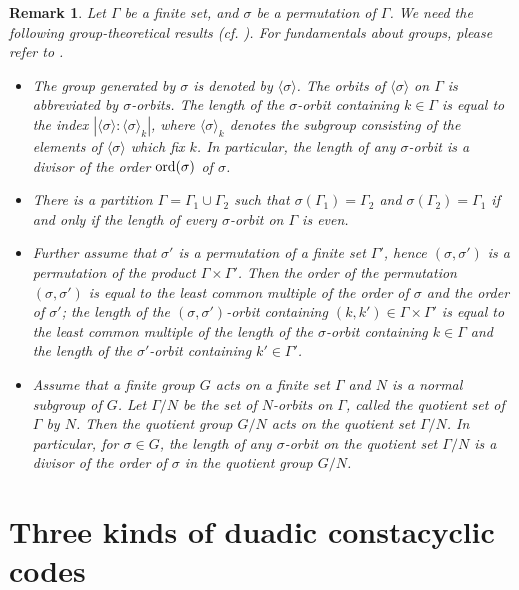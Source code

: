 \documentclass{article}
\newtheorem{Remark}[Theorem]{Remark}
\numberwithin{equation}{section}
\numberwithin{table}{section}
\begin{document}
\begin{Remark}\label{group theory}\rm
Let $\Gamma$ be a finite set, and $\sigma$ be a permutation of $\Gamma$.
We need the following group-theoretical results (cf. \cite[Lemmas 6-8]{CDFL}).
For fundamentals about groups, please refer to \cite{AB}.
\begin{itemize}
\item[(i)]
The group generated by $\sigma$ is denoted by $\langle\sigma\rangle$.
The orbits of $\langle\sigma\rangle$ on $\Gamma$ is abbreviated by
{\em $\sigma$-orbits}. The length of the $\sigma$-orbit containing
$k\in\Gamma$ is equal to the index
$|\langle\sigma\rangle:\langle\sigma\rangle_k|$, where
$\langle\sigma\rangle_k$ denotes the subgroup consisting of
the elements of $\langle\sigma\rangle$ which fix $k$.
In particular, the length of any $\sigma$-orbit is a divisor of the
order ${\rm ord}(\sigma)$ of $\sigma$.
\item[(ii)]
There is a  partition $\Gamma=\Gamma_1\cup\Gamma_{2}$ such that
$\sigma(\Gamma_1)=\Gamma_{2}$ and $\sigma(\Gamma_2)=\Gamma_{1}$
if and only if the length of every $\sigma$-orbit on $\Gamma$ is even.
\item[(iii)]
Further assume that $\sigma'$ is a permutation of a finite set $\Gamma'$,
hence $(\sigma,\sigma')$ is a permutation of the product
$\Gamma\times\Gamma'$.  Then the order of the permutation $(\sigma,\sigma')$
is equal to the least common multiple of the order of $\sigma$ and 
the order of $\sigma'$; the length of the $(\sigma,\sigma')$-orbit
containing $(k,k')\in\Gamma\times\Gamma'$ is equal to the
least common multiple of the length of the $\sigma$-orbit containing $k\in\Gamma$
and the length of the $\sigma'$-orbit containing $k'\in\Gamma'$.
\item[(iv)]
Assume that a finite group $G$ acts on a finite set $\Gamma$
and $N$ is a normal subgroup of $G$.
Let $\Gamma/N$ be the set of $N$-orbits on $\Gamma$,
called the {\em quotient set} of $\Gamma$ by $N$.
Then the quotient group $G/N$ acts on the quotient set $\Gamma/N$.
In particular, for $\sigma\in G$, the length of any $\sigma$-orbit
on the quotient set $\Gamma/N$ is a divisor of the order
of $\sigma$ in the quotient group $G/N$.
\end{itemize}
\end{Remark}

\section{Three kinds of duadic constacyclic codes}
\end{document}
